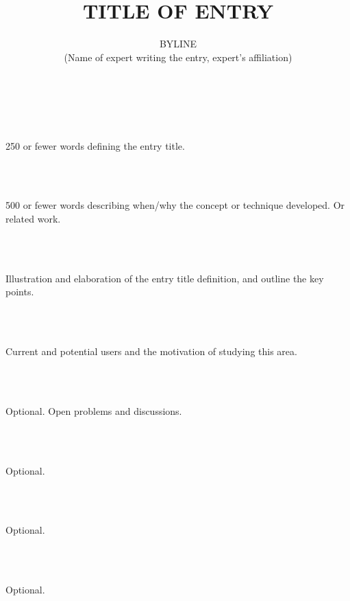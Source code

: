 \documentclass[twoside,leqno,onecolumn]{article}
\begin{document}
\title{TITLE OF ENTRY}
\author{BYLINE \\ (Name of expert writing the entry, expert's affiliation)}

\date{}
\maketitle

\noindent
\begin{synonyms}
\end{synonyms}
~\\\\

\begin{definition}
	250 or fewer words defining the entry title.
\end{definition}
~\\\\
\begin{historicalBG}
	500 or fewer words describing when/why the concept or technique developed. Or related work.
\end{historicalBG}
~\\\\
\begin{scientific}
	Illustration and elaboration of the entry title definition, and outline the key points.
\end{scientific}
~\\\\
\begin{keyApp}
	Current and potential users and the motivation of studying this area.
\end{keyApp}
~\\\\
\begin{future}
	Optional. Open problems and discussions.
\end{future}
~\\\\
\begin{experimental}
	Optional. 
\end{experimental}
~\\\\
\begin{datasets}
	Optional.  
\end{datasets}
~\\\\
\begin{URL}
	Optional.  
\end{URL}
~\\\\
\end{document}
